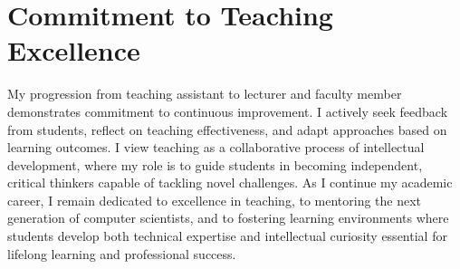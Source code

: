 \documentclass[11pt,letterpaper]{article}
\begin{document}
\section*{Commitment to Teaching Excellence}

My progression from teaching assistant to lecturer and faculty member demonstrates commitment to continuous improvement. I actively seek feedback from students, reflect on teaching effectiveness, and adapt approaches based on learning outcomes. I view teaching as a collaborative process of intellectual development, where my role is to guide students in becoming independent, critical thinkers capable of tackling novel challenges. As I continue my academic career, I remain dedicated to excellence in teaching, to mentoring the next generation of computer scientists, and to fostering learning environments where students develop both technical expertise and intellectual curiosity essential for lifelong learning and professional success.
\end{document}
